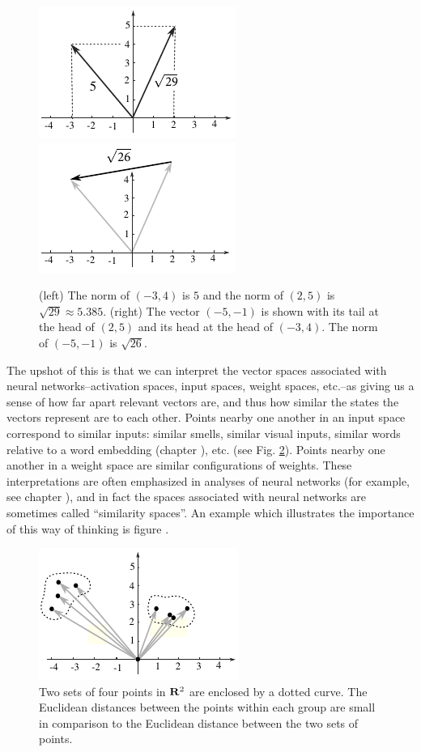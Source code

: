 \begin{figure}[h]
\centering
\includegraphics[scale=1.55]{./images/Norm.pdf}
\qquad
\includegraphics[scale=1.55]{./images/dist.pdf}
\caption{(left) The norm of $(-3,4)$ is $5$ and the norm of $(2,5)$ is 
$\sqrt{29} \approx 5.385$. (right) The vector $(-5,-1)$ is shown with its tail at the head 
of $(2,5)$ and its head at the head of $(-3,4)$. The norm of $(-5,-1)$ is 
$\sqrt{26}$.}
\label{metricfig}
\end{figure}

   The upshot of this is that we can interpret the vector spaces associated 
with neural networks--activation spaces, input spaces, weight spaces, etc.--as 
giving us a sense of how far apart relevant vectors are, and thus how similar 
the states the vectors represent are to each other. Points nearby one another 
in an input space correspond to similar inputs: similar smells, similar visual 
inputs, similar words relative to a word embedding (chapter 
), etc. (see Fig. \ref{nearfar}). Points nearby one 
another in a weight space are similar configurations of weights. These 
interpretations are often emphasized in analyses of neural networks (for 
example, see chapter ), and in fact the spaces 
associated with neural networks are sometimes called ``similarity spaces''. An 
example which illustrates the importance of this way of thinking is figure 
.

\begin{figure}[h]
\centering
\includegraphics[scale=1.55]{./images/Nearfar.pdf}
\caption{Two sets of four points in ${\bf R}^2$ are enclosed by a dotted curve. 
The Euclidean distances between the points within each group are small in 
comparison to the Euclidean distance between the two sets of points.}
\label{nearfar}
\end{figure}

